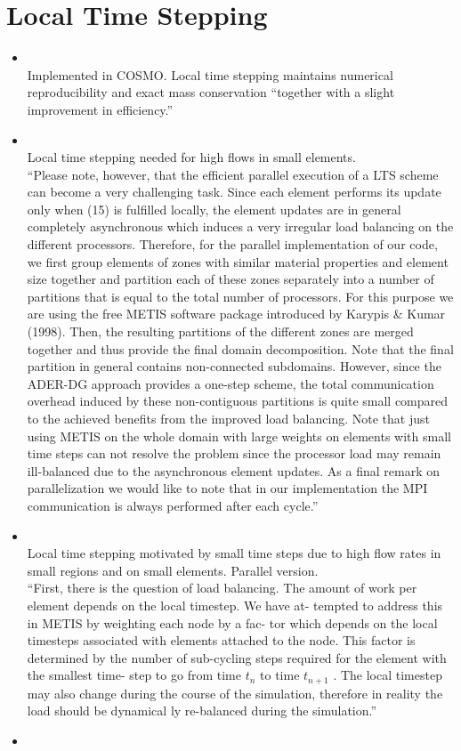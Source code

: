 \documentclass[12pt]{article}
\begin{document}
\section*{Local Time Stepping}

\begin{itemize}
\item {} \ \\ 
Implemented in COSMO. Local time stepping maintains numerical reproducibility and exact mass conservation ``together with a slight improvement in
efficiency.''

\item {} \ \\ 
Local time stepping needed for high flows in small elements. \\
``Please note,
however, that the efficient parallel execution of a LTS scheme can become a very challenging task. Since each element performs its update
only when (15) is fulfilled locally, the element updates are in general completely asynchronous which induces a very irregular load balancing
on the different processors. Therefore, for the parallel implementation of our code, we first group elements of zones with similar material
properties and element size together and partition each of these zones separately into a number of partitions that is equal to the total number
of processors. For this purpose we are using the free METIS software package introduced by Karypis \& Kumar (1998). Then, the resulting
partitions of the different zones are merged together and thus provide the final domain decomposition. Note that the final partition in general
contains non-connected subdomains. However, since the ADER-DG approach provides a one-step scheme, the total communication overhead
induced by these non-contiguous partitions is quite small compared to the achieved benefits from the improved load balancing. Note that just
using METIS on the whole domain with large weights on elements with small time steps can not resolve the problem since the processor
load may remain ill-balanced due to the asynchronous element updates. As a final remark on parallelization we would like to note that in our
implementation the MPI communication is always performed after each cycle.''

\item {} \ \\ 
Local time stepping motivated by small time steps due to high flow rates in small regions and on small elements. Parallel version. \\
``First, there is the question of load balancing. The amount of
work per element depends on the local timestep. We have at-
tempted to address this in METIS by weighting each node by a fac-
tor which depends on the local timesteps associated with elements
attached to the node. This factor is determined by the number of
sub-cycling steps required for the element with the smallest time-
step to go from time $t_n$ to time $t_{n+1}$ . The local timestep may also
change during the course of the simulation, therefore in reality
the load should be dynamical ly re-balanced during the simulation.''

\item \bibentry{} \ \\ 
\end{itemize}

\end{document}
